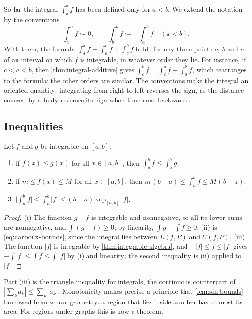 So far the integral $\int_a^bf$ has been defined only for $a<b$. We extend the notation by the conventions
\[
\int_a^af\coloneqq0,\qquad\int_b^af\coloneqq-\int_a^bf\quad(a<b).
\]
With them, the formula $\int_a^bf=\int_a^cf+\int_c^bf$ holds for any three points $a$, $b$ and $c$ of an interval on which $f$ is integrable, in whatever order they lie. For instance, if $c<a<b$, then \cref{thm:integral-additive} gives $\int_c^bf=\int_c^af+\int_a^bf$, which rearranges to the formula; the other orders are similar. The conventions make the integral an oriented quantity: integrating from right to left reverses the sign, as the distance covered by a body reverses its sign when time runs backwards.

\subsection{Inequalities}

\begin{theorem}
\label{thm:integral-monotone}
Let $f$ and $g$ be integrable on $[a,b]$.
\begin{enumerate}
\item If $f(x)\le g(x)$ for all $x\in[a,b]$, then $\int_a^bf\le\int_a^bg$.
\item If $m\le f(x)\le M$ for all $x\in[a,b]$, then $m\,(b-a)\le\int_a^bf\le M\,(b-a)$.
\item $\bigl|\int_a^bf\bigr|\le\int_a^b|f|\le(b-a)\sup_{[a,b]}|f|$.
\end{enumerate}
\end{theorem}

\begin{proof}
(i) The function $g-f$ is integrable and nonnegative, so all its lower sums are nonnegative, and $\int(g-f)\ge0$; by linearity, $\int g-\int f\ge0$. (ii) is \eqref{eq:darboux-bounds}, since the integral lies between $L(f,P)$ and $U(f,P)$. (iii) The function $|f|$ is integrable by \cref{thm:integrable-algebra}, and $-|f|\le f\le|f|$ gives $-\int|f|\le\int f\le\int|f|$ by (i) and linearity; the second inequality is (ii) applied to $|f|$.
\end{proof}

Part (iii) is the triangle inequality for integrals, the continuous counterpart of $|\sum_ka_k|\le\sum_k|a_k|$. Monotonicity makes precise a principle that \cref{lem:sin-bounds} borrowed from school geometry: a region that lies inside another has at most its area. For regions under graphs this is now a theorem.

